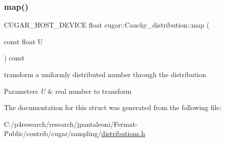 \subsubsection{\texorpdfstring{map()}{map()}}
{\footnotesize\ttfamily C\+U\+G\+A\+R\+\_\+\+H\+O\+S\+T\+\_\+\+D\+E\+V\+I\+CE float cugar\+::\+Cauchy\+\_\+distribution\+::map (\begin{DoxyParamCaption}\item[{const float}]{U }\end{DoxyParamCaption}) const\hspace{0.3cm}{\ttfamily [inline]}}

transform a uniformly distributed number through the distribution


\begin{DoxyParams}{Parameters}
{\em U} & real number to transform \\
\hline
\end{DoxyParams}


The documentation for this struct was generated from the following file\+:\begin{DoxyCompactItemize}
\item 
C\+:/p4research/research/jpantaleoni/\+Fermat-\/\+Public/contrib/cugar/sampling/\hyperlink{distributions_8h}{distributions.\+h}\end{DoxyCompactItemize}
